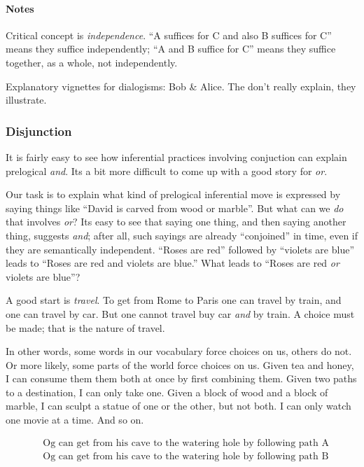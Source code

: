 \documentclass{article}
\begin{document}
\paragraph{Notes\\}

Critical concept is \textit{independence}. ``A suffices for C and also
B suffices for C'' means they suffice independently; ``A and B suffice
for C'' means they suffice together, as a whole, not independently.

Explanatory vignettes for dialogisms: Bob \& Alice. The don't really
explain, they illustrate.

\subsubsection{Disjunction}

It is fairly easy to see how inferential practices involving
conjuction can explain prelogical \textit{and}. Its a bit more
difficult to come up with a good story for \textit{or}.

Our task is to explain what kind of prelogical inferential move is
expressed by saying things like ``David is carved from wood or
marble''. But what can we \textit{do} that involves \textit{or}? Its
easy to see that saying one thing, and then saying another thing,
suggests \textit{and}; after all, such sayings are already
``conjoined'' in time, even if they are semantically independent.
``Roses are red'' followed by ``violets are blue'' leads to ``Roses
are red and violets are blue.'' What leads to ``Roses are red
\textit{or} violets are blue''?

A good start is \textit{travel}. To get from Rome to Paris one can
travel by train, and one can travel by car. But one cannot travel buy
car \textit{and} by train. A choice must be made; that is the nature
of travel.

In other words, some words in our vocabulary force choices on us,
others do not. Or more likely, some parts of the world force choices
on us. Given tea and honey, I can consume them them both at once by
first combining them. Given two paths to a destination, I can only
take one. Given a block of wood and a block of marble, I can sculpt a
statue of one or the other, but not both. I can only watch one movie
at a time. And so on.

\begin{align}
 & \text{Og can get from his cave to the watering hole by following path A} \\
 & \text{Og can get from his cave to the watering hole by following path B}
\end{align}
\end{document}
